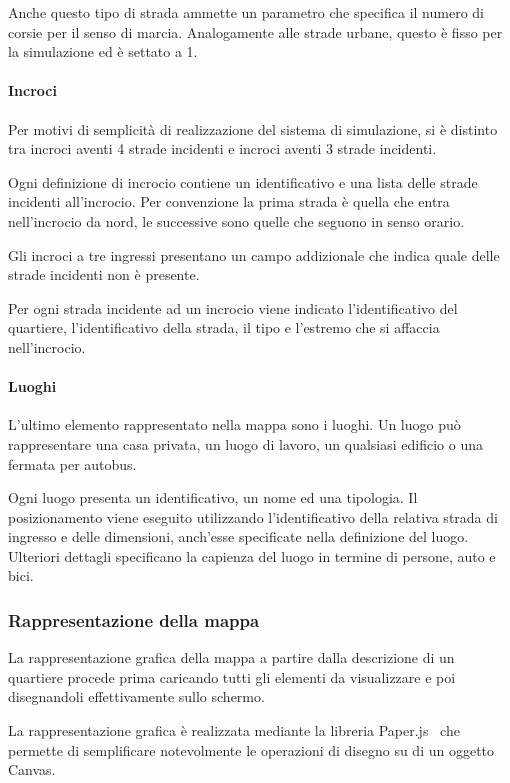 Anche questo tipo di strada ammette un parametro che specifica il numero di
corsie per il senso di marcia. Analogamente alle strade urbane, questo è fisso
per la simulazione ed è settato a 1.

\paragraph*{Incroci}
Per motivi di semplicità di realizzazione del sistema di simulazione, si è
distinto tra incroci aventi 4 strade incidenti e incroci aventi 3 strade
incidenti. 

Ogni definizione di incrocio contiene un identificativo e una lista delle strade
incidenti all'incrocio. Per convenzione la prima strada è quella che entra
nell'incrocio da nord, le successive sono quelle che seguono in senso orario.

Gli incroci a tre ingressi presentano un campo addizionale che indica quale
delle strade incidenti non è presente.

Per ogni strada incidente ad un incrocio viene indicato l'identificativo del
quartiere, l'identificativo della strada, il tipo e l'estremo che si affaccia
nell'incrocio.

\paragraph*{Luoghi}
L'ultimo elemento rappresentato nella mappa sono i luoghi. Un luogo può
rappresentare una casa privata, un luogo di lavoro, un qualsiasi edificio o una
fermata per autobus. 

Ogni luogo presenta un identificativo, un nome ed una tipologia. Il
posizionamento viene eseguito utilizzando l'identificativo della relativa strada
di ingresso e delle dimensioni, anch'esse specificate nella definizione del
luogo. Ulteriori dettagli specificano la capienza del luogo in termine di
persone, auto e bici.

\subsubsection{Rappresentazione della mappa}
La rappresentazione grafica della mappa a partire dalla descrizione di un
quartiere procede prima caricando tutti gli elementi da visualizzare e poi
disegnandoli effettivamente sullo schermo.

La rappresentazione grafica è realizzata mediante la libreria Paper.js~\cite{paperjs}
che permette di semplificare notevolmente le operazioni di disegno su di un
oggetto Canvas.

